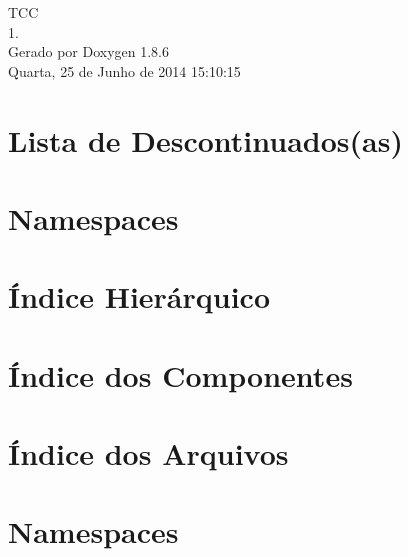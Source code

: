 \documentclass[twoside]{book}
\newcommand{\clearemptydoublepage}{%
  \newpage{\pagestyle{empty}\cleardoublepage}%
}
\begin{document}
\hypersetup{pageanchor=false}
\begin{titlepage}
\vspace*{7cm}
\begin{center}%
{\Large T\-C\-C \\[1ex]\large 1. }\\
\vspace*{1cm}
{\large Gerado por Doxygen 1.8.6}\\
\vspace*{0.5cm}
{\small Quarta, 25 de Junho de 2014 15:10:15}\\
\end{center}
\end{titlepage}
\clearemptydoublepage
\tableofcontents
\clearemptydoublepage
{}
\hypersetup{pageanchor=true}

\chapter{Lista de Descontinuados(as)}
\label{deprecated}
\hypertarget{deprecated}{}

\chapter{Namespaces}

\chapter{Índice Hierárquico}

\chapter{Índice dos Componentes}

\chapter{Índice dos Arquivos}

\chapter{Namespaces}










\end{document}
